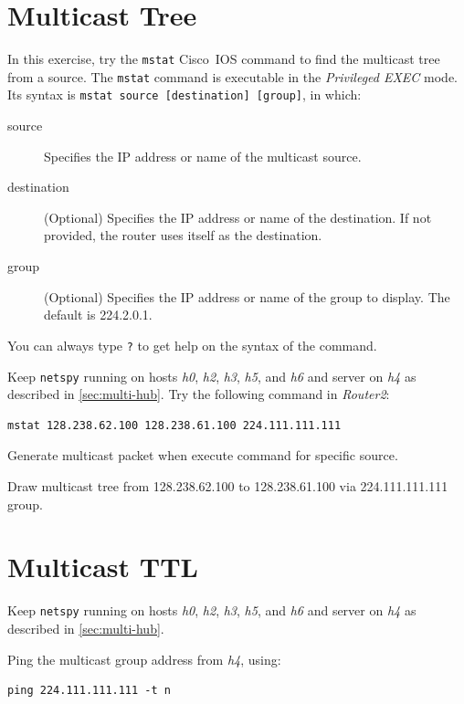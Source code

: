 \documentclass{../UTNetLab}
\begin{document}
\section{Multicast Tree}
    In this exercise, try the \lstinline[language={cisco}]{mstat} Cisco~IOS command to find the multicast tree from a source.
    The \lstinline[language={cisco}]{mstat} command is executable in the \textit{Privileged EXEC} mode.
    Its syntax is \lstinline[language={cisco}, emph={source, destination, group}]{mstat source [destination] [group]}, in which:
    \begin{description}
        \item[source] Specifies the IP address or name of the multicast source.
        \item[destination] (Optional) Specifies the IP address or name of the destination. If not provided, the router uses itself as the destination.
        \item[group] (Optional) Specifies the IP address or name of the group to display. The default is 224.2.0.1.
    \end{description}
    You can always type \lstinline[language={cisco}]{?} to get help on the syntax of the command.

    Keep \lstinline{netspy} running on hosts \textit{h0}, \textit{h2}, \textit{h3}, \textit{h5}, and \textit{h6} and server on \textit{h4} as described in \autoref{sec:multi-hub}.
    Try the following command in \textit{Router2}:
    \begin{lstlisting}[language={cisco}]
mstat 128.238.62.100 128.238.61.100 224.111.111.111
    \end{lstlisting}

    Generate multicast packet when execute command for specific source.

    \begin{report}
    \item Draw multicast tree from 128.238.62.100 to 128.238.61.100 via 224.111.111.111 group.
    \end{report}

\section{Multicast TTL}
    Keep \lstinline{netspy} running on hosts \textit{h0}, \textit{h2}, \textit{h3}, \textit{h5}, and \textit{h6} and server on \textit{h4} as described in \autoref{sec:multi-hub}.
    
    Ping the multicast group address from \textit{h4}, using: 
    \begin{lstlisting}[emph={n}]
ping 224.111.111.111 -t n
    \end{lstlisting}
\end{document}
